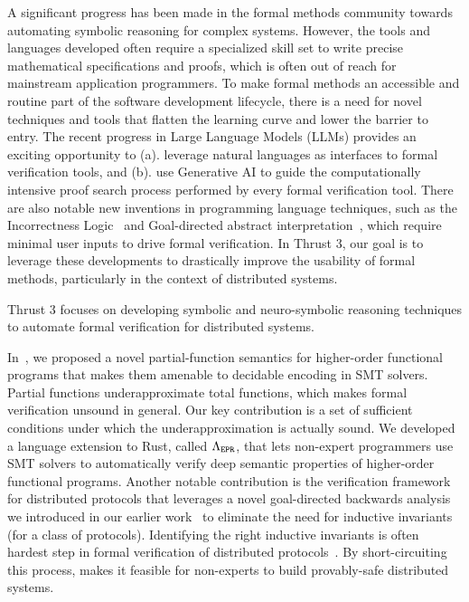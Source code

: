 A  significant progress has been made in the formal methods community
towards automating symbolic reasoning for complex systems. However, the
tools and languages developed often require a specialized skill set to
write precise mathematical specifications and proofs, which is often out of
reach for mainstream application programmers. To make formal methods an
accessible and routine part of the software development lifecycle, there is
a need for novel techniques and tools that flatten the learning curve and
lower the barrier to entry. The recent progress in Large Language Models
(LLMs) provides an exciting opportunity to (a). leverage natural languages
as interfaces to formal verification tools, and (b). use Generative AI to
guide the computationally intensive proof search process performed by every
formal verification tool. There are also notable new inventions in
programming language techniques, such as the Incorrectness
Logic~\cite{ohearn-popl19} and Goal-directed abstract
interpretation~\cite{historia-oopsla23}, which require minimal user inputs
to drive formal verification. In Thrust 3, our goal is to leverage these
developments to drastically improve the usability of formal methods,
particularly in the context of distributed systems. 
\begin{mdquote}
Thrust 3 focuses on developing symbolic and neuro-symbolic reasoning
techniques to automate formal verification for distributed systems. 
\end{mdquote}

 In~\cite{lewchenko-oopsla26}, we
proposed a novel partial-function semantics for higher-order functional
programs that makes them amenable to decidable encoding in SMT solvers.
Partial functions underapproximate total functions, which makes formal
verification unsound in general. Our key contribution is a set of
sufficient conditions under which the underapproximation is actually sound.
We developed a language extension to Rust, called $\Lambda_{\texttt{EPR}}$, that lets
non-expert programmers use SMT solvers to automatically verify deep
semantic properties of higher-order functional programs. Another notable
contribution is the \dissprove verification
framework~\cite{fontenot-dissprove} for distributed protocols that
leverages a novel goal-directed backwards analysis we introduced in our
earlier work~\cite{meier-oopsla23} to eliminate the need for inductive
invariants (for a class of protocols). Identifying the right inductive
invariants is often hardest step in formal verification of distributed
protocols~\cite{ivy2016}. By short-circuiting this process, \dissprove
makes it feasible for non-experts to build provably-safe distributed
systems.

